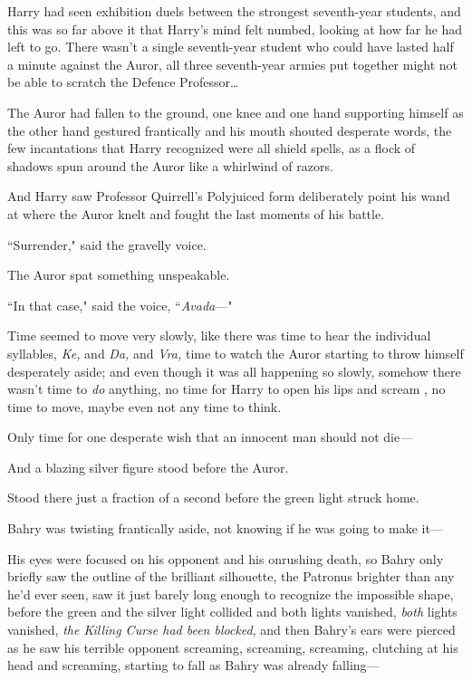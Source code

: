 Harry had seen exhibition duels between the strongest seventh-year students, and this was so far above it that Harry's mind felt numbed, looking at how far he had left to go. There wasn't a single seventh-year student who could have lasted half a minute against the Auror, all three seventh-year armies put together might not be able to scratch the Defence Professor…

The Auror had fallen to the ground, one knee and one hand supporting himself as the other hand gestured frantically and his mouth shouted desperate words, the few incantations that Harry recognized were all shield spells, as a flock of shadows spun around the Auror like a whirlwind of razors.

And Harry saw Professor Quirrell's Polyjuiced form deliberately point his wand at where the Auror knelt and fought the last moments of his battle.

``Surrender," said the gravelly voice.

The Auror spat something unspeakable.

``In that case," said the voice, ``\emph{Avada}—"

Time seemed to move very slowly, like there was time to hear the individual syllables, \emph{Ke,} and \emph{Da,} and \emph{Vra,} time to watch the Auror starting to throw himself desperately aside; and even though it was all happening so slowly, somehow there wasn't time to \emph{do} anything, no time for Harry to open his lips and scream , no time to move, maybe even not any time to think.

Only time for one desperate wish that an innocent man should not die\emph{—}

And a blazing silver figure stood before the Auror.

Stood there just a fraction of a second before the green light struck home.

\later

Bahry was twisting frantically aside, not knowing if he was going to make it—

His eyes were focused on his opponent and his onrushing death, so Bahry only briefly saw the outline of the brilliant silhouette, the Patronus brighter than any he'd ever seen, saw it just barely long enough to recognize the impossible shape, before the green and the silver light collided and both lights vanished, \emph{both} lights vanished, \emph{the Killing Curse had been blocked}, and then Bahry's ears were pierced as he saw his terrible opponent screaming, screaming, screaming, clutching at his head and screaming, starting to fall as Bahry was already falling—

